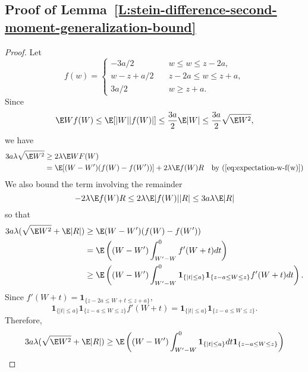 \subsection{Proof of  Lemma~\ref{L:stein-difference-second-moment-generalization-bound}}
\begin{proof}
  Let
  \begin{equation*}
    f(w) =
    \begin{cases}
      -3a / 2 &\quad w \leq w \leq z - 2a, \\
      w - z + a / 2 &\quad z - 2a \leq w \leq z + a, \\
      3a / 2 &\quad w \geq z + a.
    \end{cases}
  \end{equation*}
  Since
  \begin{equation*}
    \E W f(W) \leq \E [|W| |f(W)|] \leq \frac{3a}{2} \E |W| \leq \frac{3a}{2} \sqrt{\E W^2},
  \end{equation*}
  we have
  \begin{align*}
    3a \lambda \sqrt{\E W^2} &\geq 2\lambda \E WF(W) \\
    &= \E [(W-W')(f(W)-f(W'))] + 2 \lambda \E f(W)R \quad \text{by } (\ref{eq:expectation-w-f(w)})
  \end{align*}
  We also bound the term involving the remainder
  \begin{equation*}
    -2 \lambda \E f(W)R  \leq 2 \lambda \E |f(W)| |R| \leq 3a \lambda \E |R|
  \end{equation*}
  so that
  \begin{align*}
    3a \lambda (\sqrt{\E W^2} + \E |R|) &\geq \E (W-W')(f(W)-f(W')) \\
    &= \E \left ( (W-W') \int_{W'-W}^{0} f'(W+t)dt \right ) \\
    &\geq \E \left( (W-W') \int_{W'-W}^0 \mathbf{1}_{\{|t| \leq a\}}
    \mathbf{1}_{\{z - a \leq W \leq z\}} f'(W + t) dt \right ).
  \end{align*}
  Since $f'(W + t) = \mathbf{1}_{\{z - 2a \leq W + t \leq z + a \}}$,
  \begin{equation*}
    \mathbf{1}_{\{|t| \leq a\}} \mathbf{1}_{\{z - a \leq W \leq z\}} f'(W + t) =
    \mathbf{1}_{\{|t| \leq a\}} \mathbf{1}_{\{z - a \leq W \leq z\}}.
  \end{equation*}
  Therefore,
  \begin{align*}
    3a \lambda (\sqrt{\E W^2} + \E |R|) &\geq
    \E \left( (W-W') \int_{W'-W}^0 \mathbf{1}_{\{|t| \leq a\}} dt
    \mathbf{1}_{\{z - a \leq W \leq z\}} \right ) \\

\end{align*}
\end{proof}
